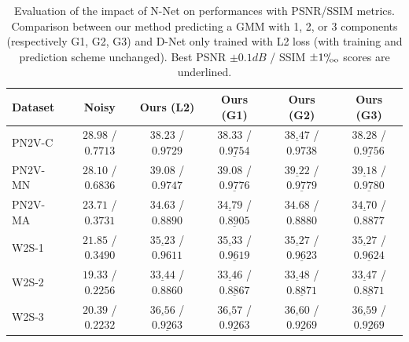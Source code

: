\documentclass{article}
\def\permille{\ensuremath{{}^\text{o}\mkern-5mu/\mkern-3mu_\text{oo}}}
\begin{document}
\begin{table}[ht]
\caption{Evaluation of the impact of N-Net on performances with PSNR/SSIM metrics. Comparison between our method predicting a GMM with 1, 2, or 3 components (respectively G1, G2, G3) and D-Net only trained with L2 loss (with training and prediction scheme unchanged).
Best PSNR $\pm0.1dB$ / SSIM $\pm1\permille$ scores are underlined.}
\label{si:table:results}
\begin{center}
\begin{sc}
\begin{tabular}{lccccc}
\toprule
Dataset & Noisy & Ours (L2) & Ours (G1) & Ours (G2) & Ours (G3) \\
\midrule
PN2V-C & $28.98$ / $0.7713$ & $38.23$ / $0.9729$ & $38.33$ / $\underline{0.9754}$ & $\underline{38.47}$ / $0.9738$ & $38.28$ / $\underline{0.9756}$ \\
PN2V-MN & $28.10$ / $0.6836$ & $39.08$ / $0.9747$ & $39.08$ / $\underline{0.9776}$ & $\underline{39.22}$ / $\underline{0.9779}$ & $\underline{39.18}$ / $\underline{0.9780}$ \\
PN2V-MA & $23.71$ / $0.3731$ & $34.63$ / $0.8890$ & $\underline{34.79}$ / $\underline{0.8905}$ & $34.68$ / $0.8880$ & $\underline{34.70}$ / $0.8877$ \\
W2S-1 & $21.85$ / $0.3490$ & $\underline{35.23}$ / $0.9611$ & $\underline{35.33}$ / $\underline{0.9619}$ & $\underline{35.27}$ / $\underline{0.9623}$ & $\underline{35.27}$ / $\underline{0.9624}$ \\
W2S-2 & $19.33$ / $0.2256$ & $\underline{33.44}$ / $0.8860$ & $\underline{33.46}$ / $\underline{0.8867}$ & $\underline{33.48}$ / $\underline{0.8871}$ & $\underline{33.47}$ / $\underline{0.8871}$ \\
W2S-3 & $20.39$ / $0.2232$ & $\underline{36.56}$ / $\underline{0.9263}$ & $\underline{36.57}$ / $\underline{0.9263}$ & $\underline{36.60}$ / $\underline{0.9269}$ & $\underline{36.59}$ / $\underline{0.9269}$ \\
\bottomrule
\end{tabular}
\end{sc}
\end{center}
\end{table}
\FloatBarrier
\end{document}
